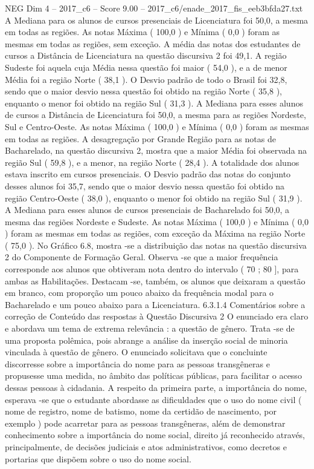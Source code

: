 \begin{textsample}{NEG Dim 4 – 2017\_c6 – Score 9.00 – 2017\_c6/enade\_2017\_fis\_eeb3bfda27.txt}
A Mediana para os alunos de cursos presenciais de Licenciatura foi 50,0, a mesma em todas as regiões.
As notas Máxima ( 100,0 ) e Mínima ( 0,0 ) foram as mesmas em todas as regiões, sem exceção.
A média das notas dos estudantes de cursos a Distância de Licenciatura na questão discursiva 2 foi 49,1.
A região Sudeste foi aquela cuja Média nessa questão foi maior ( 54,0 ), e a de menor Média foi a região Norte ( 38,1 ).
O Desvio padrão de todo o Brasil foi 32,8, sendo que o maior desvio nessa questão foi obtido na região Norte ( 35,8 ), enquanto o menor foi obtido na região Sul ( 31,3 ).
A Mediana para esses alunos de cursos a Distância de Licenciatura foi 50,0, a mesma para as regiões Nordeste, Sul e Centro-Oeste.
As notas Máxima ( 100,0 ) e Mínima ( 0,0 ) foram as mesmas em todas as regiões.
A desagregação por Grande Região para as notas de Bacharelado, na questão discursiva 2, mostra que a maior Média foi observada na região Sul ( 59,8 ), e a menor, na região Norte ( 28,4 ).
A totalidade dos alunos estava inscrito em cursos presenciais.
O Desvio padrão das notas do conjunto desses alunos foi 35,7, sendo que o maior desvio nessa questão foi obtido na região Centro-Oeste ( 38,0 ), enquanto o menor foi obtido na região Sul ( 31,9 ).
A Mediana para esses alunos de cursos presenciais de Bacharelado foi 50,0, a mesma das regiões Nordeste e Sudeste.
As notas Máxima ( 100,0 ) e Mínima ( 0,0 ) foram as mesmas em todas as regiões, com exceção da Máxima na região Norte ( 75,0 ).
No Gráfico 6.8, mostra -se a distribuição das notas na questão discursiva 2 do Componente de Formação Geral.
Observa -se que a maior frequência corresponde aos alunos que obtiveram nota dentro do intervalo ( 70 ; 80 ], para ambas as Habilitações.
Destacam -se, também, os alunos que deixaram a questão em branco, com proporção um pouco abaixo da frequência modal para o Bacharelado e um pouco abaixo para a Licenciatura. 6.3.1.4 Comentários sobre a correção de Conteúdo das respostas à Questão Discursiva 2 O enunciado era claro e abordava um tema de extrema relevância : a questão de gênero.
Trata -se de uma proposta polêmica, pois abrange a análise da inserção social de minoria vinculada à questão de gênero.
O enunciado solicitava que o concluinte discorresse sobre a importância do nome para as pessoas transgêneras e propusesse uma medida, no âmbito das políticas públicas, para facilitar o acesso dessas pessoas à cidadania.
A respeito da primeira parte, a importância do nome, esperava -se que o estudante abordasse as dificuldades que o uso do nome civil ( nome de registro, nome de batismo, nome da certidão de nascimento, por exemplo ) pode acarretar para as pessoas transgêneras, além de demonstrar conhecimento sobre a importância do nome social, direito já reconhecido através, principalmente, de decisões judiciais e atos administrativos, como decretos e portarias que dispõem sobre o uso do nome social.

\end{textsample}
